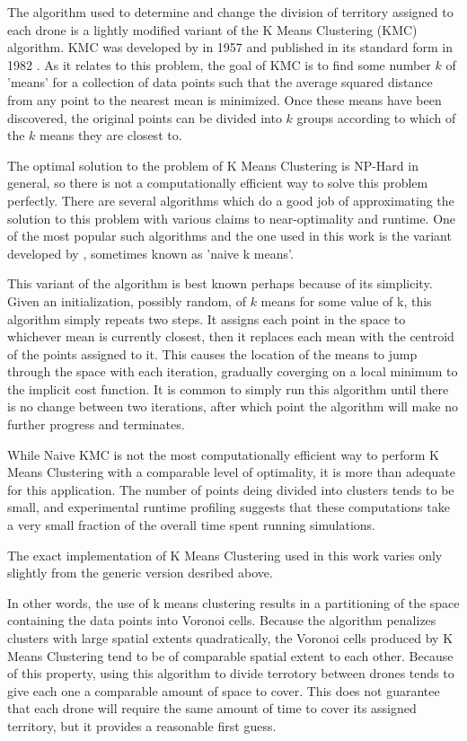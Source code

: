 The algorithm used to determine and change the division of territory assigned to each drone is a lightly modified variant of the K Means Clustering (KMC) algorithm. KMC was developed by \citeauthor{KMC} in 1957 and published in its standard form in 1982 \cite{KMC}. As it relates to this problem, the goal of KMC is to find some number $k$ of 'means' for a collection of data points such that the average squared distance from any point to the nearest mean is minimized. Once these means have been discovered, the original points can be divided into $k$ groups according to which of the $k$ means they are closest to.

The optimal solution to the problem of K Means Clustering is NP-Hard in general, so there is not a computationally efficient way to solve this problem perfectly. There are several algorithms which do a good job of approximating the solution to this problem with various claims to near-optimality and runtime. One of the most popular such algorithms and the one used in this work is the variant developed by \citeauthor{KMC}, sometimes known as 'naive k means'.

This variant of the algorithm is best known perhaps because of its simplicity. Given an initialization, possibly random, of $k$ means for some value of k, this algorithm simply repeats two steps. It assigns each point in the space to whichever mean is currently closest, then it replaces each mean with the centroid of the points assigned to it. This causes the location of the means to jump through the space with each iteration, gradually coverging on a local minimum to the implicit cost function. It is common to simply run this algorithm until there is no change between two iterations, after which point the algorithm will make no further progress and terminates.

While Naive KMC is not the most computationally efficient way to perform K Means Clustering with a comparable level of optimality, it is more than adequate for this application. The number of points deing divided into clusters tends to be small, and experimental runtime profiling suggests that these computations take a very small fraction of the overall time spent running simulations.

The exact implementation of K Means Clustering used in this work varies only slightly from the generic version desribed above. 

In other words, the use of k means clustering results in a partitioning of the space containing the data points into Voronoi cells. Because the algorithm penalizes clusters with large spatial extents quadratically, the Voronoi cells produced by K Means Clustering tend to be of comparable spatial extent to each other. Because of this property, using this algorithm to divide terrotory between drones tends to give each one a comparable amount of space to cover. This does not guarantee that each drone will require the same amount of time to cover its assigned territory, but it provides a reasonable first guess.

